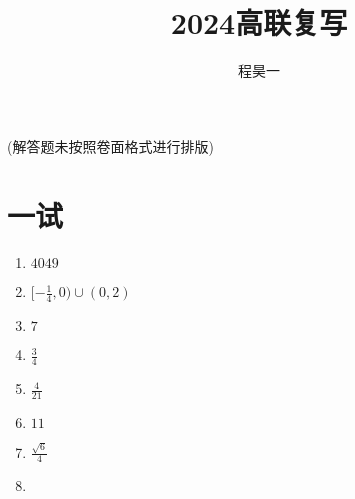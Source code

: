 \documentclass{article}
\title{2024高联复写}
\author{\kaishu  程昊一}
\begin{document}
\maketitle 

(解答题未按照卷面格式进行排版)

\section{一试}

\begin{enumerate}
\item $4049$
\item $[-\frac14,0)\cup(0,2)$
\item $7$
\item $\frac34$
\item $\frac{4}{21}$
\item $11$
\item $\frac{\sqrt{6}}{4}$
\item 
\end{enumerate}
\end{document}

